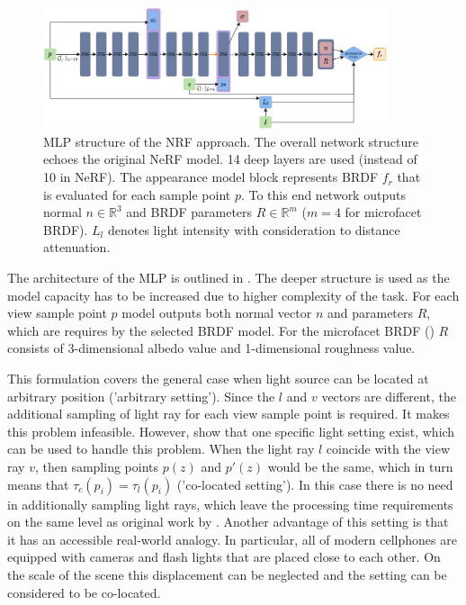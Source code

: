 \begin{figure}[t]
    \centering
    \includegraphics[width=0.9\textwidth]{figures/vanilla_nrf.png}
    \caption{MLP structure of the NRF \cite{bi2020neural} approach.
The overall network structure echoes the original NeRF model.
14 deep layers are used (instead of 10 in NeRF).
The appearance model block represents BRDF $f_r$
that is evaluated for each sample point $p$.
To this end network outputs normal $n \in \mathbb{R}^3$
and BRDF parameters $R \in \mathbb{R}^m$ ($m=4$ for microfacet BRDF).
$L_l$ denotes light intensity with consideration to distance attenuation.
}
    \label{fig:nrf_structure}
\end{figure}

The architecture of the MLP is outlined in .
The deeper structure is used as the model capacity has to be increased
due to higher complexity of the task.
For each view sample point $p$ model outputs both normal vector $n$ and parameters $R$,
which are requires by the selected BRDF model.
For the microfacet BRDF (\cite{walter2007microfacet}) $R$ consists of 3-dimensional albedo value
and 1-dimensional roughness value.



This formulation covers the general case when light source can be located at arbitrary position ('arbitrary setting').
Since the $l$ and $v$ vectors are different,
the additional sampling of light ray for each view sample point is required.
It makes this problem infeasible.
However, \cite{bi2020neural} show that one specific light setting exist,
which can be used to handle this problem.
When the light ray $l$ coincide with the view ray $v$,
then sampling points $p(z)$ and $p'(z)$ would be the same,
which in turn means that $\tau_c(p_i) = \tau_l(p_i)$ ('co-located setting').
In this case there is no need in additionally sampling light rays,
which leave the processing time requirements on the same level as original work by \cite{mildenhall2020nerf}.
Another advantage of this setting is that it has an accessible real-world analogy.
In particular, all of modern cellphones are equipped with cameras
and flash lights that are placed close to each other.
On the scale of the scene this displacement can be neglected and the setting can be considered to be co-located.

